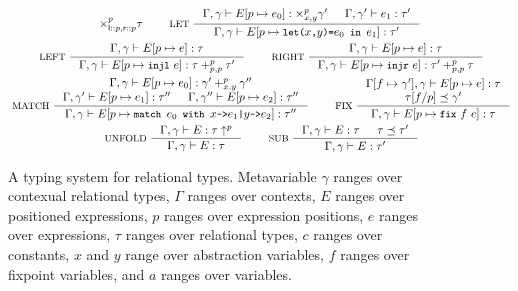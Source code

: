 \begin{figure}
\begin{gather*}
{      \times_{\leftchild \cons p, \rightchild \cons p}^p \tau } \qquad
    \inference[ LET ]{
      \Gamma, \gamma \judges \upd{ E }{p}{ e_0 } : \times_{x, y}^p \gamma' &
      \Gamma, \gamma' \judges e_1 : \tau' }{
      \Gamma, \gamma \judges \upd{E}{p}{ \letexp{x}{y}{e_0}{e_1} } : %
      \tau' } \\
    \inference[ LEFT ]{
      \Gamma, \gamma \judges \upd{E}{p}{ e } : \tau }{
      \Gamma, \gamma \judges \upd{E}{p}{ \injl\ e} : %
      \tau +_{p, p}^p \tau' } \qquad
    \inference[ RIGHT ]{
      \Gamma, \gamma \judges \upd{E}{p}{ e } : \tau }{
      \Gamma, \gamma \judges \upd{E}{p}{ \injr\ e} : %
      \tau' +_{p, p}^p \tau } \\
    \inference[ MATCH ]{
      \Gamma, \gamma \judges \upd{E}{p}{e_0} : %
      \gamma' +_{x, y}^p \gamma'' \\
      \Gamma, \gamma' \judges \upd{E}{p}{e_1} : \tau'' &
      \Gamma, \gamma'' \judges \upd{E}{p}{e_2} : \tau'' }{
      \Gamma, \gamma \judges %
      \upd{E}{p}{ \matchexp{e_0}{ x }{e_1}{ y }{e_2} } : %
      \tau'' } \qquad
    \inference[ FIX ]{
      \upd{ \Gamma }{ f }{ \gamma' }, \gamma \judges %
      \upd{ E }{ p }{ e } : \tau \\
      \replace{ \tau }{ p }{ f } \subtype \gamma' }{ %
      \Gamma, \gamma \judges \upd{ E }{ p }{ \fix{f}{e} }: \tau } \\
    \inference[ UNFOLD ]{
      \Gamma, \gamma \judges E : \unfold{\tau}{p} }{ 
      \Gamma, \gamma \judges E : \tau } \qquad
    \inference[ SUB ]{
      \Gamma, \gamma \judges E : \tau &
      \tau \subtype \tau' }{ %
      \Gamma, \gamma \judges E : \tau' }
  \end{gather*}
  \caption{A typing system for relational types.
    Metavariable %
    $\gamma$ ranges over contexual relational types, %
    $\Gamma$ ranges over contexts, %
    $E$ ranges over positioned expressions, %
    $p$ ranges over expression positions, %
    $e$ ranges over expressions, %
    $\tau$ ranges over relational types, %
    $c$ ranges over constants, %
    $x$ and $y$ range over abstraction variables, %
    $f$ ranges over fixpoint variables, and %
    $a$ ranges over variables. }
  \label{fig:reltypes-rules}
\end{figure}

